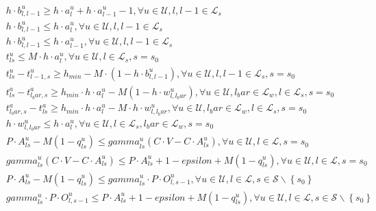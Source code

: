 \begin{align}
  & h \cdot b_{l , l - 1}^{u} \geq h \cdot a_{l}^{u} + h \cdot a_{l - 1}^{u} - 1 , \forall u \in \mathcal{U} , l , l - 1 \in \mathcal{L}_{s} \tag{eq\_0034} \\
  & h \cdot b_{l , l - 1}^{u} \leq h \cdot a_{l}^{u} , \forall u \in \mathcal{U} , l , l - 1 \in \mathcal{L}_{s} \tag{eq\_0035} \\
  & h \cdot b_{l , l - 1}^{u} \leq h \cdot a_{l - 1}^{u} , \forall u \in \mathcal{U} , l , l - 1 \in \mathcal{L}_{s} \tag{eq\_0036} \\
  & t_{l s}^{u} \leq M \cdot h \cdot a_{l}^{u} , \forall u \in \mathcal{U} , l \in \mathcal{L}_{s} , s = s_{0} \tag{eq\_0037} \\
  & t_{l s}^{u} - t_{l - 1 , s}^{u} \geq h_{min} - M \cdot \left(1 - h \cdot b_{l , l - 1}^{u}\right) , \forall u \in \mathcal{U} , l , l - 1 \in \mathcal{L}_{s} , s = s_{0} \tag{eq\_0038} \\
  & t_{l s}^{a} - t_{l_bar , s}^{a} \geq h_{min} \cdot h \cdot a_{l}^{u} - M \left(1 - h \cdot w_{l , l_bar}^{u}\right) , \forall u \in \mathcal{U} , l_bar \in \mathcal{L}_{w} , l \in \mathcal{L}_{s} , s = s_{0} \tag{eq\_0039} \\
  & t_{l_bar , s}^{a} - t_{l s}^{a} \geq h_{min} \cdot h \cdot a_{l}^{u} - M \cdot h \cdot w_{l , l_bar}^{u} , \forall u \in \mathcal{U} , l_bar \in \mathcal{L}_{w} , l \in \mathcal{L}_{s} , s = s_{0} \tag{eq\_0040} \\
  & h \cdot w_{l , l_bar}^{u} \leq h \cdot a_{l}^{u} , \forall u \in \mathcal{U} , l \in \mathcal{L}_{s} , l_bar \in \mathcal{L}_{w} , s = s_{0} \tag{eq\_0041} \\
  & P \cdot A_{l s}^{u} - M \left(1 - q_{l s}^{u}\right) \leq \mathit{gamma}_{l s}^{u} \left(C \cdot V - C \cdot A_{l s}^{u}\right) , \forall u \in \mathcal{U} , l \in \mathcal{L} , s = s_{0} \tag{eq\_0042} \\
  & \mathit{gamma}_{l s}^{u} \left(C \cdot V - C \cdot A_{l s}^{u}\right) \leq P \cdot A_{l s}^{u} + 1 - \mathit{epsilon} + M \left(1 - q_{l s}^{u}\right) , \forall u \in \mathcal{U} , l \in \mathcal{L} , s = s_{0} \tag{eq\_0043} \\
  & P \cdot A_{l s}^{u} - M \left(1 - q_{l s}^{u}\right) \leq \mathit{gamma}_{l s}^{u} \cdot P \cdot O_{l , s - 1}^{u} , \forall u \in \mathcal{U} , l \in \mathcal{L} , s \in \mathcal{S} \backslash \left\{s_{0}\right\} \tag{eq\_0044} \\
  & \mathit{gamma}_{l s}^{u} \cdot P \cdot O_{l , s - 1}^{u} \leq P \cdot A_{l s}^{u} + 1 - \mathit{epsilon} + M \left(1 - q_{l s}^{u}\right) , \forall u \in \mathcal{U} , l \in \mathcal{L} , s \in \mathcal{S} \backslash \left\{s_{0}\right\} \tag{eq\_0045} \\

\end{align}

